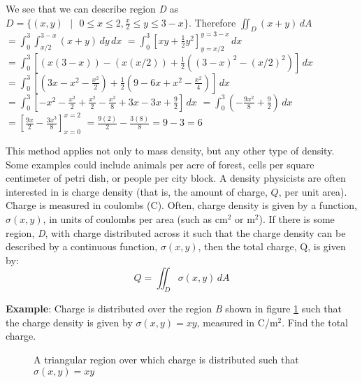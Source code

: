 \begin{Answer}[ref = total_mass]
\begin{enumerate}
    We see that we can describe region \textit{D} as $\textit{D} = \{ (x, y) 
    \text{ }|\text{ } 0 \leq x \leq 2, \frac{x}{2} \leq y \leq 3 - x\}$. 
    Therefore $\iint_{\textit{D}} \left( x + y \right) \,dA$ $= \int_0^3 \int_{
    x/2}^{3 - x} \left(x + y \right)\,dy\,dx$ $= \int_0^3 \left[xy + 
    \frac{1}{2} y^2 \right]_{y = x/2}^{y = 3 - x}\,dx$ $= \int_0^3 \left[ 
    \left(x(3 - x) \right) - \left(x (x/2) \right) + \frac{1}{2} \left( (3 - 
    x)^2 - (x/2)^2 \right) \right]\,dx$ $= \int_0^3 \left[ \left(3x - x^2 - 
    \frac{x^2}{2} \right) + \frac{1}{2} \left( 9 - 6x + x^2 - \frac{x^2}{4} 
    \right) \right]\,dx$ $= \int_0^3 \left[-x^2 - \frac{x^2}{2} + \frac{x^2}{2}
    - \frac{x^2}{8} + 3x - 3x + \frac{9}{2} \right]\,dx$ $= \int_0^3 \left( -
    \frac{9x^2}{8} + \frac{9}{2} \right)\,dx$ $= \left[ \frac{9x}{2} -\frac{
    3x^3}{8} \right]_{x = 0}^{x = 2}$ $= \frac{9(2)}{2} - \frac{3(8)}{8} = 9 - 
    3 = 6$
\end{enumerate}
\end{Answer}

This method applies not only to mass density, but any other type of density. 
Some examples could include animals per acre of forest, cells per square 
centimeter of petri dish, or people per city block. A density physicists are 
often interested in is charge density (that is, the amount of charge, $Q$, per 
unit area). Charge is measured in coulombs (C). Often, charge density is given 
by a function, $\sigma (x, y)$, in units of coulombs per area (such as 
$\text{cm}^2$ or $\text{m}^2$). If there is some region, \textit{D}, with 
charge distributed across it such that the charge density can be described 
by a continuous function, $\sigma (x, y)$, then the total charge, Q, is given 
by:
$$Q = \iint_{\textit{D}} \sigma (x, y)\,dA$$

\textbf{Example}: Charge is distributed over the region \textit{B} shown in 
figure \ref{fig:charge} such that the charge density is given by $\sigma (x, y)
= xy$, measured in C/$\text{m}^2$. Find the total charge. 

\begin{figure}[htbp]
\centering
    \caption{A triangular region over which charge is distributed such that 
    $\sigma (x, y) = xy$}
    \label{fig:charge}
\end{figure}

